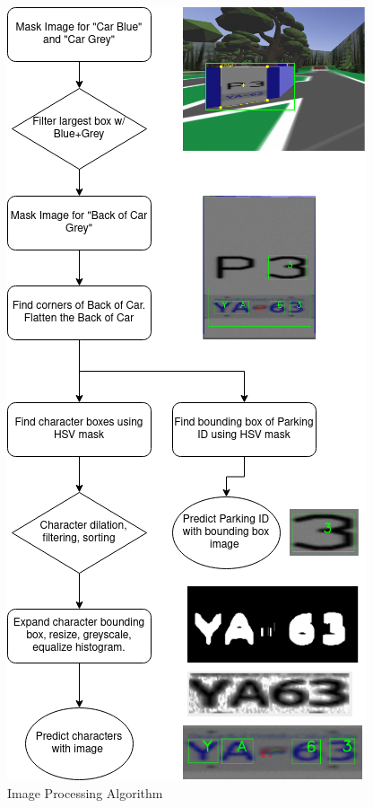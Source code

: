 \documentclass[titlepage, twocolumn]{article}
\begin{document}
\begin{figure}[H]
\centering
\includegraphics[width=\linewidth]{Image Processing Algorithm.drawio.png}
\caption{Image Processing Algorithm}
\label{fig:platepipeline}
\end{figure}
\end{document}
